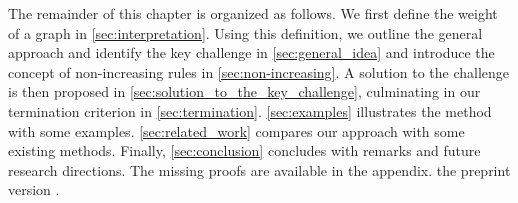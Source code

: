 The remainder of this chapter is organized as follows.
We first define the weight of a graph in \autoref{sec:interpretation}. 
Using this definition, we outline the general approach and identify the key challenge in \autoref{sec:general_idea} and introduce the concept of non-increasing rules in \autoref{sec:non-increasing}. 
A solution to the challenge is then proposed in \autoref{sec:solution_to_the_key_challenge}, culminating in our termination criterion in \autoref{sec:termination}.
\autoref{sec:examples} illustrates the method with some examples.
\autoref{sec:related_work} compares our approach with some existing methods.
Finally, \autoref{sec:conclusion} concludes with remarks and future research directions. The missing proofs are available in 
\iflongversion
the appendix.
\else
the preprint version \cite{qiu2025termination}.
\fi